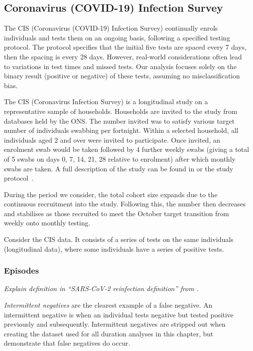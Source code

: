 \documentclass[thesis.tex]{subfiles}
\begin{document}
\subsection{Coronavirus (COVID-19) Infection Survey} \label{intro:sec:cis}

The CIS (Coronavirus (COVID-19) Infection Survey) continually enrols individuals and tests them on an ongoing basis, following a
specified testing protocol. The protocol specifies that the initial five
tests are spaced every 7 days, then the spacing is every 28 days.
However, real-world considerations often lead to variations in test
times and missed tests. Our analysis focuses solely on the binary result
(positive or negative) of these tests, assuming no misclassification
bias.

The CIS (Coronavirus Infection Survey) is a longitudinal study on a representative sample of households.
Households are invited to the study from databases held by the ONS.
The number invited was to satisfy various target number of individuals swabbing per fortnight.
Within a selected household, all individuals aged 2 and over were invited to participate.
Once invited, an enrolment swab would be taken followed by 4 further weekly swabs (giving a total of 5 swabs on days 0, 7, 14, 21, 28 relative to enrolment) after which monthly swabs are taken.
A full description of the study can be found in \textcite[][supplementary materials]{pouwelsCommunity} or the study protocol~\autocite{cisProtocol}.

During the period we consider, the total cohort size expands due to the continuous recruitment into the study.
Following this, the number then decreases and stabilises as those recruited to meet the October target transition from weekly onto monthly testing.


Consider the CIS data.
It consists of a series of tests on the same individuals (longitudinal data), where some individuals have a series of positive tests.

\subsubsection{Episodes}

\emph{Explain definition in ``SARS-CoV-2 reinfection definition'' from \textcite{weiRisk}.}

\emph{Intermittent negatives} are the clearest example of a false negative.
An intermittent negative is when an individual tests negative but tested positive previously and subsequently.
Intermittent negatives are stripped out when creating the dataset used for all duration analyses in this chapter, but demonstrate that false negatives do occur.
\end{document}
